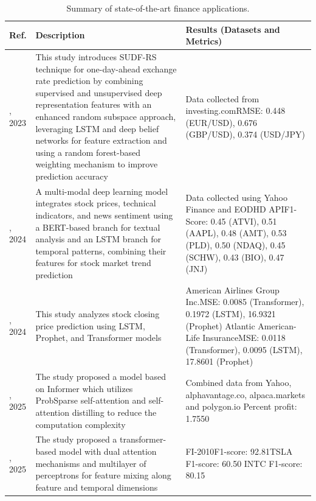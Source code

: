 \documentclass[preprint,12pt]{elsarticle}
\begin{document}
\begin{center}
\begin{table}
\caption{Summary of state-of-the-art finance applications.}
\scriptsize
\begin{tabular}{|p{1cm} | p{6.5cm} | p{6.5cm}|}
 \hline
 Ref. & Description & Results (Datasets and Metrics) \\ 
 \hline
 \citep{wang_sudf-rs_2023}, 2023 & This study introduces SUDF-RS technique for one-day-ahead exchange rate prediction by combining supervised and unsupervised deep representation features with an enhanced random subspace approach, leveraging LSTM and deep belief networks for feature extraction and using a random forest-based weighting mechanism to improve prediction accuracy & Data collected from investing.com\newline RMSE: 0.448 (EUR/USD), 0.676 (GBP/USD), 0.374 (USD/JPY) \\ 
 \hline
 \citep{chen_deep_2024}, 2024 & A multi-modal deep learning model integrates stock prices, technical indicators, and news sentiment using a BERT-based branch for textual analysis and an LSTM branch for temporal patterns, combining their features for stock market trend prediction & Data collected using Yahoo Finance and  EODHD API\newline F1-Score: 0.45 (ATVI), 0.51 (AAPL), 0.48 (AMT), 0.53 (PLD), 0.50 (NDAQ), 0.45 (SCHW), 0.43 (BIO), 0.47 (JNJ) \\
 \hline
\citep{mozaffari_predictive_2024}, 2024 & This study analyzes stock closing price prediction using LSTM, Prophet, and Transformer models & American Airlines Group Inc.\newline MSE: 0.0085 (Transformer), 0.1972 (LSTM), 16.9321 (Prophet) \newline Atlantic American-Life Insurance\newline MSE: 0.0118 (Transformer), 0.0095 (LSTM), 17.8601 (Prophet) \\
 \hline
 \citep{li_transformer_2025}, 2025 & The study proposed a model based on Informer which utilizes ProbSparse self-attention and self-attention distilling to reduce the computation complexity & Combined data from Yahoo, alphavantage.co, alpaca.markets and polygon.io \newline Percent profit: 1.7550 \\
 \hline
 \citep{berti_tlob_2025}, 2025 & The study proposed a transformer-based model with dual attention mechanisms and multilayer of perceptrons for feature mixing along feature and temporal dimensions & FI-2010\newline F1-score: 92.81\newline TSLA \newline F1-score: 60.50 \newline INTC \newline F1-score: 80.15 \\ 
 \hline
\end{tabular}
\label{table_summary_finance_studies}
\end{table}
\end{center}
\end{document}
